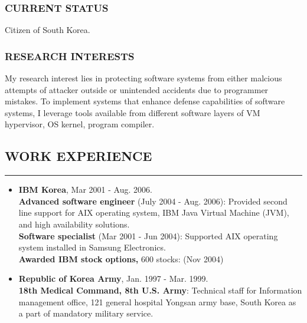 \documentclass[10pt,a4]{article}
\begin{document}
\begin{small}
\subsubsection*{CURRENT STATUS}
\begin{list}{}{}
\item Citizen of South Korea.
\end{list}

\subsubsection*{RESEARCH INTERESTS}

\begin{list}{}{}
\item My research interest lies in protecting software systems from either
  malcious attempts of attacker outside or unintended accidents due to
  programmer mistakes. To implement systems that enhance defense capabilities of
  software systems, I leverage tools available from different software layers of
  VM hypervisor, OS kernel, program compiler.
\end{list}

\subsection*{WORK EXPERIENCE}
\hrule
\vspace{0.2cm}
\begin{itemize}
\item {\bf IBM Korea},  Mar 2001 - Aug. 2006.  \\
  {\bf Advanced software engineer} (July 2004 - Aug. 2006): Provided second line
  support for AIX operating system, IBM Java Virtual Machine (JVM), and high
  availability solutions. \\
  {\bf Software specialist} (Mar 2001 - Jun 2004): Supported AIX operating system
  installed in Samsung Electronics. \\
  {\bf Awarded IBM stock options,} 600 stocks: (Nov 2004)\\
%
\item {\bf Republic of Korea Army}, Jan. 1997 - Mar. 1999. \\
{\bf 18th Medical Command, 8th U.S. Army}: Technical staff for Information
management office, 121 general hospital Yongsan army base, South Korea as a part
of mandatory military service.\\


\end{itemize}
\end{small}
\end{document}
